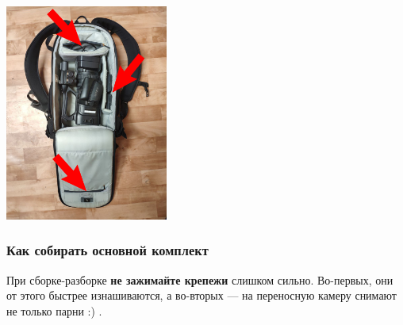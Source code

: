 \begin{center}
  \begin{minipage}[c]{\textwidth}\label{fig:bag-open}
    \centering
    \includegraphics[width=0.4\textwidth]{Images/PortableCamera/BasicSet/bag-open.jpg}
  \end{minipage}
\end{center}

\subsubsection{Как собирать основной комплект}

\begin{tcolorbox}
  При сборке-разборке \textbf{не зажимайте крепежи} слишком сильно. Во-первых, они от этого быстрее изнашиваются, а во-вторых --- на переносную камеру снимают не только парни :) .
\end{tcolorbox}

